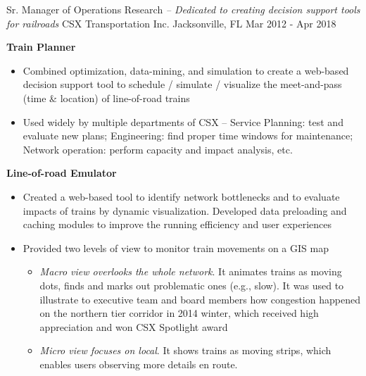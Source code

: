 \begin{cventries}

\cventry
{Sr. Manager of Operations Research \textit{ -- Dedicated to creating decision support tools for railroads}}            %
{CSX Transportation Inc. }                %
{Jacksonville, FL}                       %
{Mar 2012 - Apr 2018}                     %
{
    \begin{cvitems}
    \item {
        \textbf{Train Planner} 
        \begin{itemize}
            \item  Combined optimization, data-mining, and simulation to create a web-based decision support tool to schedule / simulate / visualize the meet-and-pass (time \& location) of line-of-road trains 
            \item  Used widely by multiple departments of CSX -- Service Planning: test and evaluate new plans; Engineering: find proper time windows for maintenance; Network operation: perform capacity and impact analysis, etc.
        \end{itemize}           
    }
    \item {
        \textbf{Line-of-road Emulator} 
        \begin{itemize}
        \item  Created a web-based tool to identify network bottlenecks and to evaluate impacts of trains by dynamic visualization. 
               Developed data preloading and caching modules to improve the running efficiency and user experiences
        \item  Provided two levels of view to monitor train movements on a GIS map  
        \begin{itemize}
            \item  \textit{Macro view overlooks the whole network}.  
                   It animates trains as moving dots, finds and marks out problematic ones (e.g., slow). 
                   It was used to illustrate to executive team and board members how congestion happened on the northern tier corridor in 2014 winter, 
                   which received high appreciation and won CSX Spotlight award
            \item  \textit{Micro view focuses on local}. It shows trains as moving strips, which enables users observing more details en route. 

\end{itemize}
\end{itemize}}
\end{cvitems}}
\end{cventries}
